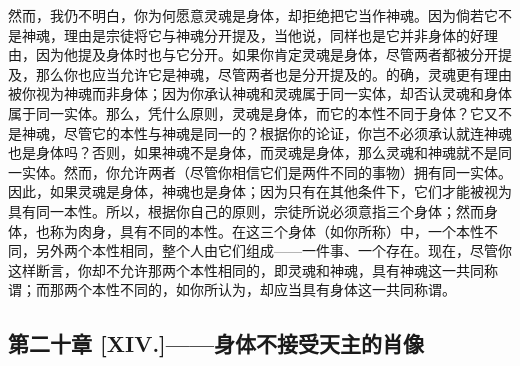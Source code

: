 然而，我仍不明白，你为何愿意灵魂是身体，却拒绝把它当作神魂。因为倘若它不是神魂，理由是宗徒将它与神魂分开提及，当他说，同样也是它并非身体的好理由，因为他提及身体时也与它分开。如果你肯定灵魂是身体，尽管两者都被分开提及，那么你也应当允许它是神魂，尽管两者也是分开提及的。的确，灵魂更有理由被你视为神魂而非身体；因为你承认神魂和灵魂属于同一实体，却否认灵魂和身体属于同一实体。那么，凭什么原则，灵魂是身体，而它的本性不同于身体？它又不是神魂，尽管它的本性与神魂是同一的？根据你的论证，你岂不必须承认就连神魂也是身体吗？否则，如果神魂不是身体，而灵魂是身体，那么灵魂和神魂就不是同一实体。然而，你允许两者（尽管你相信它们是两件不同的事物）拥有同一实体。因此，如果灵魂是身体，神魂也是身体；因为只有在其他条件下，它们才能被视为具有同一本性。所以，根据你自己的原则，宗徒所说必须意指三个身体；然而身体，也称为肉身，具有不同的本性。在这三个身体（如你所称）中，一个本性不同，另外两个本性相同，整个人由它们组成——一件事、一个存在。现在，尽管你这样断言，你却不允许那两个本性相同的，即灵魂和神魂，具有神魂这一共同称谓；而那两个本性不同的，如你所认为，却应当具有身体这一共同称谓。\par


\subsection{第二十章 [XIV.]——身体不接受天主的肖像}

